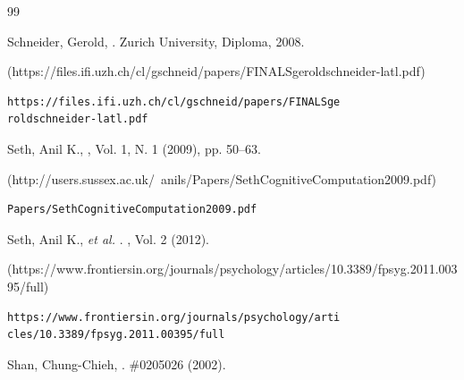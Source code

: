 \begin{thebibliography}{99}
{\begin{bItem}[GeroldSchneider]
Schneider, Gerold, 
.
Zurich University, Diploma, 2008.%
%
\begin{boxurl}(https://files.ifi.uzh.ch/cl/gschneid/papers/FINALSgeroldschneider-latl.pdf)
\begin{lstlisting}
https://files.ifi.uzh.ch/cl/gschneid/papers/FINALSge
roldschneider-latl.pdf
\end{lstlisting}
\end{boxurl}\end{bItem}


\begin{bItem}[AnilSeth]
Seth, Anil K., 
,  
Vol. 1, N. 1 (2009), 
pp. 50--63. 
%
\begin{boxurl}(http://users.sussex.ac.uk/~anils/Papers/SethCognitiveComputation2009.pdf)
\begin{lstlisting}
Papers/SethCognitiveComputation2009.pdf
\end{lstlisting}
\end{boxurl}\end{bItem}



\begin{bItem}[Sethetal]
Seth, Anil K., \textit{et al.}  
.
,
Vol. 2 (2012).
%
\begin{boxurl}(https://www.frontiersin.org/journals/psychology/articles/10.3389/fpsyg.2011.00395/full)
\begin{lstlisting}
https://www.frontiersin.org/journals/psychology/arti
cles/10.3389/fpsyg.2011.00395/full
\end{lstlisting}
\end{boxurl}\end{bItem}

\pagebreak{}

\begin{bItem}[ChungChiehShan]
Shan, Chung-Chieh,
.
 \#0205026 (2002).\hspace{-2pt}
%
\end{bItem}


}
\end{thebibliography}
